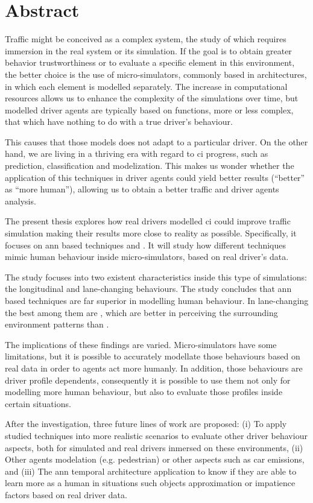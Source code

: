 \cleardoublepage
\thispagestyle{empty}
\chapter*{Abstract}
\begin{fullwidth}
	Traffic might be conceived as a complex system, the study of which requires immersion in the real system or its simulation. If the goal is to obtain greater behavior trustworthiness or to evaluate a specific element in this environment, the better choice is the use of micro-simulators, commonly based in  architectures, in which each element is modelled separately. The increase in computational resources allows us to enhance the complexity of the simulations over time, but modelled driver agents are typically based on functions, more or less complex, that which have nothing to do with a true driver’s behaviour. 
	
	This causes that those models does not adapt to a particular driver. On the other hand, we are living in a thriving era with regard to \Acrlong{ci} progress, such as prediction, classification and modelization. This makes us wonder whether the application of this techniques in driver agents could yield better results (\enquote{better} as \enquote{more human}), allowing us to obtain a better traffic and driver agents analysis.
	
	The present thesis explores how real drivers modelled \acrlong{ci} could improve traffic simulation making their results more close to reality as possible. Specifically, it focuses on \Acrlong{ann} based techniques and . It will study how different techniques mimic human behaviour inside micro-simulators, based on real driver’s data.
	
	The study focuses into two existent characteristics inside this type of simulations: the longitudinal and lane-changing behaviours. The study concludes that \acrlong{ann} based techniques are far superior in modelling human behaviour. In lane-changing the best among them are , which are better in perceiving the surrounding environment patterns than .
	
	The implications of these findings are varied. Micro-simulators have some limitations, but it is possible to accurately modellate those behaviours based on real data in order to agents act more humanly. In addition, those behaviours are driver profile dependents, consequently it is possible to use them not only for modelling more human behaviour, but also to evaluate those profiles inside certain situations.
	
	After the investigation, three future lines of work are proposed: (i) To apply studied techniques into more realistic scenarios to evaluate other driver behaviour aspects, both for simulated and real drivers inmersed on these environments, (ii) Other agents modelation (e.g. pedestrian) or other aspects such as car emissions, and (iii) The \acrlong{ann} temporal architecture application to know if they are able to learn more as a human in situations such objects approximation or impatience factors based on real driver data.
\end{fullwidth}